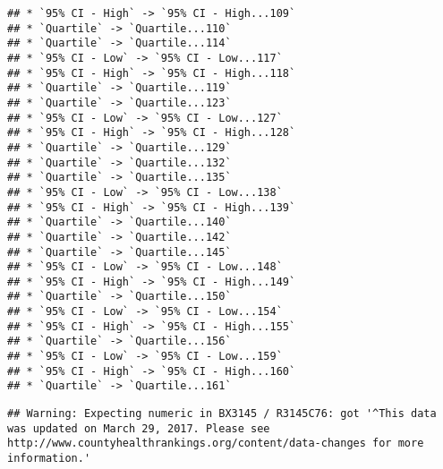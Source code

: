 \documentclass[
]{article}
\begin{document}
\begin{verbatim}
## * `95% CI - High` -> `95% CI - High...109`
## * `Quartile` -> `Quartile...110`
## * `Quartile` -> `Quartile...114`
## * `95% CI - Low` -> `95% CI - Low...117`
## * `95% CI - High` -> `95% CI - High...118`
## * `Quartile` -> `Quartile...119`
## * `Quartile` -> `Quartile...123`
## * `95% CI - Low` -> `95% CI - Low...127`
## * `95% CI - High` -> `95% CI - High...128`
## * `Quartile` -> `Quartile...129`
## * `Quartile` -> `Quartile...132`
## * `Quartile` -> `Quartile...135`
## * `95% CI - Low` -> `95% CI - Low...138`
## * `95% CI - High` -> `95% CI - High...139`
## * `Quartile` -> `Quartile...140`
## * `Quartile` -> `Quartile...142`
## * `Quartile` -> `Quartile...145`
## * `95% CI - Low` -> `95% CI - Low...148`
## * `95% CI - High` -> `95% CI - High...149`
## * `Quartile` -> `Quartile...150`
## * `95% CI - Low` -> `95% CI - Low...154`
## * `95% CI - High` -> `95% CI - High...155`
## * `Quartile` -> `Quartile...156`
## * `95% CI - Low` -> `95% CI - Low...159`
## * `95% CI - High` -> `95% CI - High...160`
## * `Quartile` -> `Quartile...161`
\end{verbatim}

\begin{verbatim}
## Warning: Expecting numeric in BX3145 / R3145C76: got '^This data was updated on March 29, 2017. Please see http://www.countyhealthrankings.org/content/data-changes for more information.'
\end{verbatim}
\end{document}
